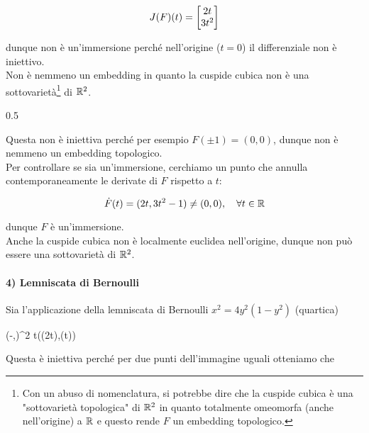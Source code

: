 \begin{equation}
	J(F)(t) = \bmqty{ 2t \\ 3t^{2} }
\end{equation}

dunque non è un'immersione perché nell'origine ($ t = 0 $) il differenziale non è iniettivo.\\
Non è nemmeno un embedding in quanto la cuspide cubica non è una sottovarietà\footnote{%
	Con un abuso di nomenclatura, si potrebbe dire che la cuspide cubica è una "sottovarietà topologica" di $ \mathbb{R}^{2} $ in quanto totalmente omeomorfa (anche nell'origine) a $ \mathbb{R} $ e questo rende $ F $ un embedding topologico.%
} di $ \mathbb{R}^{2} $.

	{0.5}{%
			}

Questa non è iniettiva perché per esempio $ F(\pm 1) = (0,0) $, dunque non è nemmeno un embedding topologico.\\
Per controllare se sia un'immersione, cerchiamo un punto che annulla contemporaneamente le derivate di $ F $ rispetto a $ t $:

\begin{equation}
	\dot{F}(t) = (2t, 3 t^{2} - 1) \neq (0,0) \qcomma \forall t \in \R
\end{equation}

dunque $ F $ è un'immersione.\\
Anche la cuspide cubica non è localmente euclidea nell'origine, dunque non può essere una sottovarietà di $ \mathbb{R}^{2} $.

\paragraph{4) Lemniscata di Bernoulli}
				
Sia l'applicazione della lemniscata di Bernoulli $ x^{2} = 4 y^{2} (1-y^{2}) $ (quartica)
				
	{(-\pi,\pi)}{\R^{2}}
	{t}{(\sin(2t),\sin(t))}


Questa è iniettiva perché per due punti dell'immagine uguali otteniamo che

